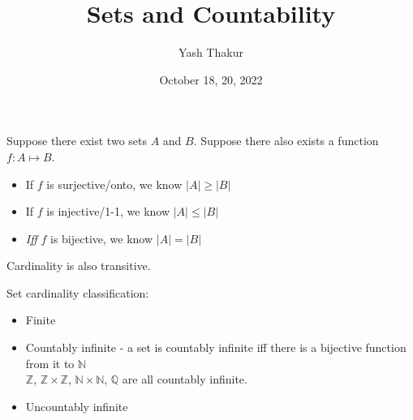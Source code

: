 \documentclass[12pt, leqno]{article}
\title{Sets and Countability}
\author{Yash Thakur}
\date{October 18, 20, 2022}
\newcommand{\Z}{\mathbb Z}
\newcommand{\N}{\mathbb N}
\newcommand{\Q}{\mathbb Q}
\begin{document}

\maketitle

Suppose there exist two sets $A$ and $B$. Suppose there also exists a function $f\colon A \mapsto B$.
\begin{itemize}
    \item If $f$ is surjective/onto, we know $|A| \geq |B|$
    \item If $f$ is injective/1-1, we know $|A| \leq |B|$
    \item \emph{Iff} $f$ is bijective, we know $|A| = |B|$
\end{itemize}

Cardinality is also transitive.

Set cardinality classification:
\begin{itemize}
    \item Finite
    \item Countably infinite - a set is countably infinite iff there is a bijective function from it to $\mathbb N$\\
    $\mathbb Z$, $\Z\times\Z$, $\N\times\N$, $\Q$ are all countably infinite.
    \item Uncountably infinite
\end{itemize}
\end{document}
